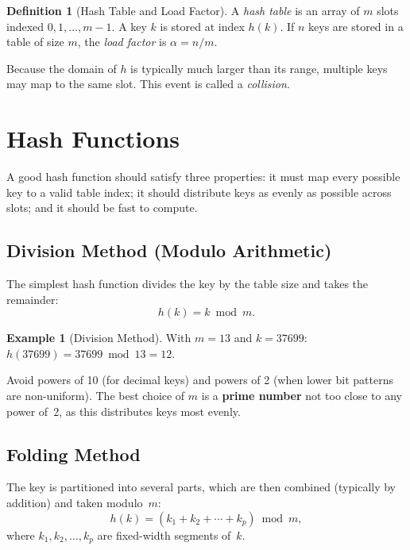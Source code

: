 \documentclass[11pt, a4paper, notitlepage]{report}
\theoremstyle{definition}
\newtheorem{definition}[theorem]{Definition}
\theoremstyle{remark}
\theoremstyle{definition}
\newtheorem{example}[theorem]{Example}
\begin{document}
\begin{definition}[Hash Table and Load Factor]
\label{def:hash-table}
A \emph{hash table} is an array of $m$ slots indexed $0, 1, \ldots, m-1$.
A key $k$ is stored at index $h(k)$.  If $n$ keys are stored in a table of
size $m$, the \emph{load factor} is $\alpha = n/m$.
\end{definition}

Because the domain of $h$ is typically much larger than its range, multiple
keys may map to the same slot.  This event is called a \emph{collision}.

\section{Hash Functions}
\label{sec:hash-functions}

A good hash function should satisfy three properties: it must map every
possible key to a valid table index; it should distribute keys as evenly as
possible across slots; and it should be fast to compute.

\subsection{Division Method (Modulo Arithmetic)}
\label{subsec:hash-division}

The simplest hash function divides the key by the table size and takes the
remainder:
\[
  h(k) = k \bmod m.
\]

\begin{example}[Division Method]
\label{ex:hash-division}
With $m = 13$ and $k = 37699$: $h(37699) = 37699 \bmod 13 = 12$.
\end{example}

\begin{examtip}[title={Choosing $m$ for the Division Method}]
Avoid powers of 10 (for decimal keys) and powers of 2 (when lower bit
patterns are non-uniform).  The best choice of $m$ is a \textbf{prime number}
not too close to any power of~2, as this distributes keys most evenly.
\end{examtip}

\subsection{Folding Method}
\label{subsec:hash-folding}

The key is partitioned into several parts, which are then combined
(typically by addition) and taken modulo~$m$:
\[
  h(k) = (k_1 + k_2 + \cdots + k_p) \bmod m,
\]
where $k_1, k_2, \ldots, k_p$ are fixed-width segments of~$k$.
\end{document}
